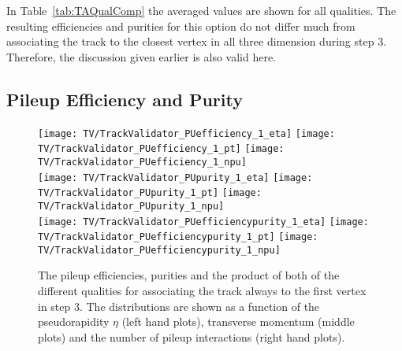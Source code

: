 In Table~\ref{tab:TAQualComp} the averaged values are shown for all qualities. The resulting efficiencies and purities for this option do not differ much from associating the track to the closest vertex in all three dimension during step 3. Therefore, the discussion given earlier is also valid here.


\clearpage{}

\subsection{Pileup Efficiency and Purity \label{sec:TAPUEFR}}

\begin{figure}[Ht]
    \centering
    \texttt{[image: TV/TrackValidator\_PUefficiency\_1\_eta]}
    \texttt{[image: TV/TrackValidator\_PUefficiency\_1\_pt]}
    \texttt{[image: TV/TrackValidator\_PUefficiency\_1\_npu]}
    \\
    \texttt{[image: TV/TrackValidator\_PUpurity\_1\_eta]}
    \texttt{[image: TV/TrackValidator\_PUpurity\_1\_pt]}
    \texttt{[image: TV/TrackValidator\_PUpurity\_1\_npu]}
    \\
    \texttt{[image: TV/TrackValidator\_PUefficiencypurity\_1\_eta]}
    \texttt{[image: TV/TrackValidator\_PUefficiencypurity\_1\_pt]}
    \texttt{[image: TV/TrackValidator\_PUefficiencypurity\_1\_npu]}
    \caption[Pileup efficiencies, purities and their product of the different qualities of the association map with associating the track always to the first vertex in step 3]{The pileup efficiencies, purities and the product of both of the different qualities for associating the track always to the first vertex in step 3. The distributions are shown as a function of the pseudorapidity $\eta$ (left hand plots), transverse momentum (middle plots) and the number of pileup interactions (right hand plots). \label{plot:TASEFRDQ1Pileup}}
\end{figure}

